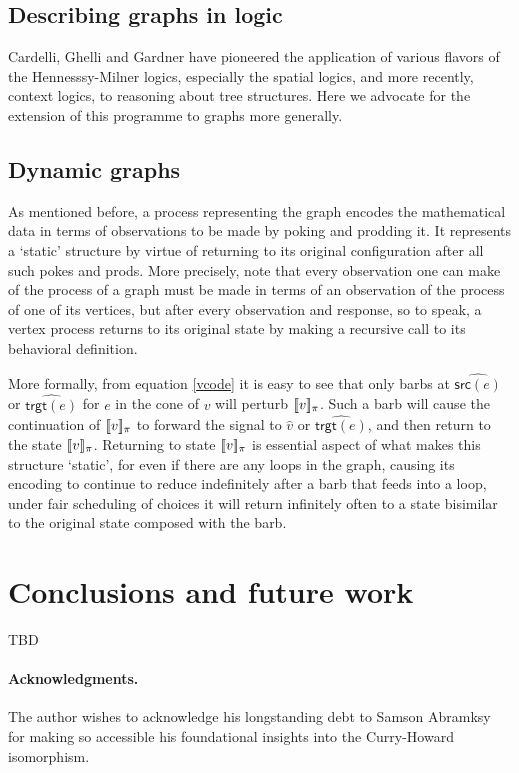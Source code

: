 \documentclass[]{llncs}
\begin{document}
\subsection{Describing graphs in logic}

Cardelli, Ghelli and Gardner have pioneered the application of various
flavors of the Hennesssy-Milner logics, especially the spatial logics,
and more recently, context logics, to reasoning about tree
structures. Here we advocate for the extension of this programme to
graphs more generally.

\subsection{Dynamic graphs}

As mentioned before, a process representing the graph encodes the
mathematical data in terms of observations to be made by poking and
prodding it. It represents a `static' structure by virtue of returning
to its original configuration after all such pokes and prods. More
precisely, note that every observation one can make of the process of
a graph must be made in terms of an observation of the process of one
of its vertices, but after every observation and response, so to
speak, a vertex process returns to its original state by making a
recursive call to its behavioral definition.

More formally, from equation \ref{vcode} it is easy to see that only
barbs at $\widehat{\textsf{src}(e)}$ or $\widehat{\textsf{trgt}(e)}$
for $e$ in the cone of $v$ will perturb $[\![ v ]\!]_{\pi}$. Such a
barb will cause the continuation of $[\![ v ]\!]_{\pi}$ to forward
the signal to $\hat{v}$ or $\widehat{\textsf{trgt}(e)}$, and then
return to the state $[\![ v ]\!]_{\pi}$. Returning to state
$[\![ v ]\!]_{\pi}$ is essential aspect of what makes this structure
`static', for even if there are any loops in the graph, causing its
encoding to continue to reduce indefinitely after a barb that feeds
into a loop, under fair scheduling of choices it will return
infinitely often to a state bisimilar to the original state composed
with the barb.

\section{Conclusions and future work}

TBD


\paragraph{Acknowledgments.}
The author wishes to acknowledge his longstanding debt to Samson
Abramksy for making so accessible his foundational insights into the
Curry-Howard isomorphism.





\end{document}
